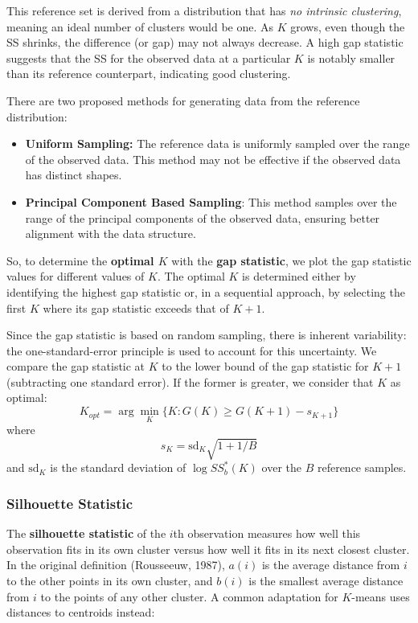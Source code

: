 \documentclass[
]{book}
\begin{document}
This reference set is derived from a distribution that has \emph{no intrinsic clustering}, meaning an ideal number of clusters would be one. As \(K\) grows, even though the SS shrinks, the difference (or gap) may not always decrease. A high gap statistic suggests that the SS for the observed data at a particular \(K\) is notably smaller than its reference counterpart, indicating good clustering.

There are two proposed methods for generating data from the reference distribution:

\begin{itemize}
\item
  \textbf{Uniform Sampling:} The reference data is uniformly sampled over the range of the observed data. This method may not be effective if the observed data has distinct shapes.
\item
  \textbf{Principal Component Based Sampling}: This method samples over the range of the principal components of the observed data, ensuring better alignment with the data structure.
\end{itemize}

So, to determine the \textbf{optimal \(K\)} with the \textbf{gap statistic}, we plot the gap statistic values for different values of \(K\). The optimal \(K\) is determined either by identifying the highest gap statistic or, in a sequential approach, by selecting the first \(K\) where its gap statistic exceeds that of \(K+1\).

Since the gap statistic is based on random sampling, there is inherent variability:
the one-standard-error principle is used to account for this uncertainty. We compare the gap statistic at \(K\) to the lower bound of the gap statistic for \(K+1\) (subtracting one standard error). If the former is greater, we consider that \(K\) as optimal:
\[K_{opt} = \arg\min_K \{K: G(K) \geq G(K+1) - s_{K+1}\}\]
where
\[s_{K} = \mathrm{sd}_{K}\sqrt{1+1/B}\]
and \(\mathrm{sd}_{K}\) is the standard deviation of \(\log SS_b^*(K)\) over the \(B\) reference samples.

\subsubsection*{Silhouette Statistic}\label{silhouette-statistic}

The \textbf{silhouette statistic} of the \(i\)th observation measures how well this observation fits in its own cluster versus how well it fits in its next closest cluster. In the original definition (Rousseeuw, 1987), \(a(i)\) is the average distance from \(i\) to the other points in its own cluster, and \(b(i)\) is the smallest average distance from \(i\) to the points of any other cluster. A common adaptation for \(K\)-means uses distances to centroids instead:
\end{document}
